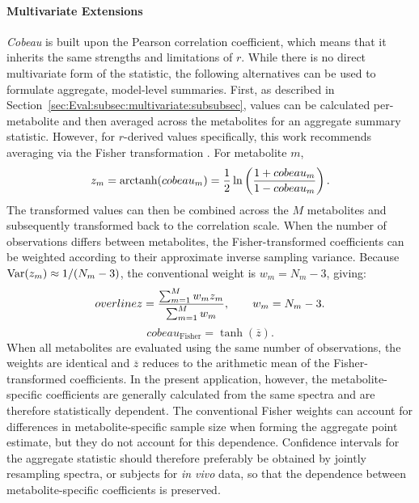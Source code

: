 \paragraph{Multivariate Extensions}
\textit{Cobeau} is built upon the Pearson correlation coefficient, which means that it inherits the same strengths and limitations of $r$. While there is no direct multivariate form of the statistic, the following alternatives can be used to formulate aggregate, model-level summaries. First, as described in Section~\ref{sec:Eval:subsec:multivariate:subsubsec}, values can be calculated per-metabolite and then averaged across the metabolites for an aggregate summary statistic. However, for $r$-derived values specifically, this work recommends averaging via the Fisher transformation \cite{Fisher1921}. For metabolite $m$,
\begin{equation}
    z_m = \textnormal{arctanh}(cobeau_m) = \frac{1}{2} \ln \left(\frac{1+cobeau_m}{1-cobeau_m}\right).
\end{equation}
The transformed values can then be combined across the $M$ metabolites and subsequently transformed back to the correlation scale. When the number of observations differs between metabolites, the Fisher-transformed coefficients can be weighted according to their approximate inverse sampling variance. Because $\textnormal{Var}(z_m)\approx 1/(N_m-3)$, the conventional weight is $w_m=N_m-3$, giving:
\begin{equation}
    \\overline{z} = \frac{\sum_{m=1}^{M} w_m z_m}{\sum_{m=1}^{M} w_m}, \qquad w_m=N_m-3.
\end{equation}
\begin{equation}
    cobeau_{\mathrm{Fisher}} = \tanh\left(\overline{z}\right).
\end{equation}
When all metabolites are evaluated using the same number of observations, the weights are identical and $\overline{z}$ reduces to the arithmetic mean of the Fisher-transformed coefficients. In the present application, however, the metabolite-specific coefficients are generally calculated from the same spectra and are therefore statistically dependent. The conventional Fisher weights can account for differences in metabolite-specific sample size when forming the aggregate point estimate, but they do not account for this dependence. Confidence intervals for the aggregate statistic should therefore preferably be obtained by jointly resampling spectra, or subjects for \textit{in vivo} data, so that the dependence between metabolite-specific coefficients is preserved.

